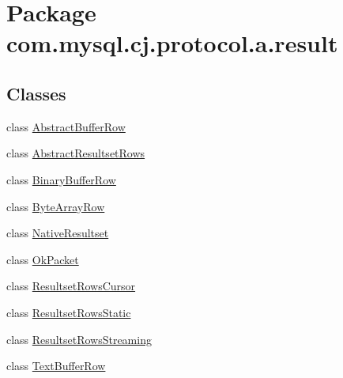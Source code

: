 \hypertarget{namespacecom_1_1mysql_1_1cj_1_1protocol_1_1a_1_1result}{}\section{Package com.\+mysql.\+cj.\+protocol.\+a.\+result}
\label{namespacecom_1_1mysql_1_1cj_1_1protocol_1_1a_1_1result}
\subsection*{Classes}
\begin{DoxyCompactItemize}
\item 
class \mbox{\hyperlink{classcom_1_1mysql_1_1cj_1_1protocol_1_1a_1_1result_1_1_abstract_buffer_row}{Abstract\+Buffer\+Row}}
\item 
class \mbox{\hyperlink{classcom_1_1mysql_1_1cj_1_1protocol_1_1a_1_1result_1_1_abstract_resultset_rows}{Abstract\+Resultset\+Rows}}
\item 
class \mbox{\hyperlink{classcom_1_1mysql_1_1cj_1_1protocol_1_1a_1_1result_1_1_binary_buffer_row}{Binary\+Buffer\+Row}}
\item 
class \mbox{\hyperlink{classcom_1_1mysql_1_1cj_1_1protocol_1_1a_1_1result_1_1_byte_array_row}{Byte\+Array\+Row}}
\item 
class \mbox{\hyperlink{classcom_1_1mysql_1_1cj_1_1protocol_1_1a_1_1result_1_1_native_resultset}{Native\+Resultset}}
\item 
class \mbox{\hyperlink{classcom_1_1mysql_1_1cj_1_1protocol_1_1a_1_1result_1_1_ok_packet}{Ok\+Packet}}
\item 
class \mbox{\hyperlink{classcom_1_1mysql_1_1cj_1_1protocol_1_1a_1_1result_1_1_resultset_rows_cursor}{Resultset\+Rows\+Cursor}}
\item 
class \mbox{\hyperlink{classcom_1_1mysql_1_1cj_1_1protocol_1_1a_1_1result_1_1_resultset_rows_static}{Resultset\+Rows\+Static}}
\item 
class \mbox{\hyperlink{classcom_1_1mysql_1_1cj_1_1protocol_1_1a_1_1result_1_1_resultset_rows_streaming}{Resultset\+Rows\+Streaming}}
\item 
class \mbox{\hyperlink{classcom_1_1mysql_1_1cj_1_1protocol_1_1a_1_1result_1_1_text_buffer_row}{Text\+Buffer\+Row}}
\end{DoxyCompactItemize}

